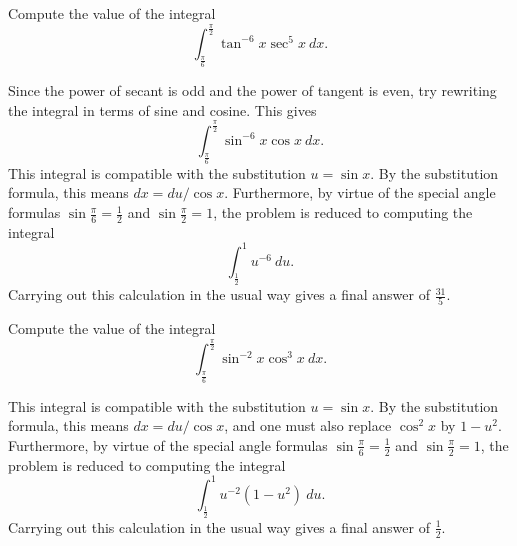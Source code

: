 \documentclass{ximera}
\begin{document}
\begin{question}%

Compute the value of the integral
\[\int_{\frac{\pi}{6}}^{\frac{\pi}{2}} \tan^{-6} x  \sec^{5} x ~dx.\]
\begin{multiplechoice}
\end{multiplechoice}
\begin{feedback}
Since the power of secant is odd and the power of tangent is even, try rewriting the integral in terms of sine and cosine. This gives 
\[\int_{\frac{\pi}{6}}^{\frac{\pi}{2}} \sin^{-6} x  \cos x ~dx.\]
This integral is compatible with the substitution \(u = \sin x\). By the substitution formula, this means \(dx = du / \cos x\). Furthermore, by virtue of the special angle formulas \(\sin \frac{\pi}{6} = \frac{1}{2}\) and \(\sin \frac{\pi}{2} = 1\), the problem is reduced to computing the integral
\[\int_{\frac{1}{2}}^{1} u^{-6} ~du.\]
Carrying out this calculation in the usual way gives a final answer of \(\frac{31}{5}\).
\end{feedback}

\end{question}

\begin{question}%

Compute the value of the integral
\[\int_{\frac{\pi}{6}}^{\frac{\pi}{2}} \sin^{-2} x  \cos^{3} x ~dx.\]
\begin{multiplechoice}
\end{multiplechoice}
\begin{feedback}
This integral is compatible with the substitution \(u = \sin x\). By the substitution formula, this means \(dx = du / \cos x\), and one must also replace \(\cos^2 x\) by \(1-u^2\). Furthermore, by virtue of the special angle formulas \(\sin \frac{\pi}{6} = \frac{1}{2}\) and \(\sin \frac{\pi}{2} = 1\), the problem is reduced to computing the integral
\[\int_{\frac{1}{2}}^{1} u^{-2}(1-u^2) ~du.\]
Carrying out this calculation in the usual way gives a final answer of \(\frac{1}{2}\).
\end{feedback}

\end{question}
\end{document}
